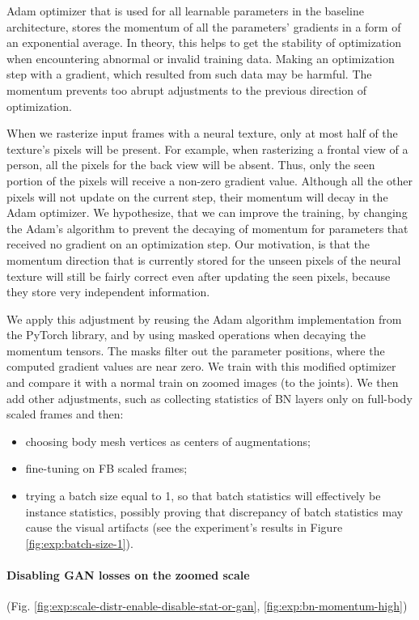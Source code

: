 Adam \cite{dnn:adam14} optimizer that is used for all learnable parameters in the baseline architecture, stores the momentum of all the parameters' gradients in a form of an exponential average. In theory, this helps to get the stability of optimization when encountering abnormal or invalid training data. Making an optimization step with a gradient, which resulted from such data may be harmful. The momentum prevents too abrupt adjustments to the previous direction of optimization. 

When we rasterize input frames with a neural texture, only at most half of the texture's pixels will be present. For example, when rasterizing a frontal view of a person, all the pixels for the back view will be absent. Thus, only the seen portion of the pixels will receive a non-zero gradient value. Although all the other pixels will not update on the current step, their momentum will decay in the Adam optimizer. We hypothesize, that we can improve the training, by changing the Adam's algorithm to prevent the decaying of momentum for parameters that received no gradient on an optimization step. Our motivation, is that the momentum direction that is currently stored for the unseen pixels of the neural texture will still be fairly correct even after updating the seen pixels, because they store very independent information.

We apply this adjustment by reusing the Adam algorithm implementation from the PyTorch library, and by using masked operations when decaying the momentum tensors. The masks filter out the parameter positions, where the computed gradient values are near zero. We train with this modified optimizer and compare it with a normal train on zoomed images (to the joints). We then add other adjustments, such as collecting statistics of BN layers only on full-body scaled frames and then:
\begin{itemize}
	\item choosing body mesh vertices as centers of augmentations;
	\item fine-tuning on FB scaled frames;
	\item trying a batch size equal to 1, so that batch statistics will effectively be instance statistics, possibly proving that discrepancy of batch statistics may cause the visual artifacts (see the experiment's results in Figure \ref{fig:exp:batch-size-1}).
\end{itemize}

\vspace{-15pt}\paragraph{Disabling GAN losses on the zoomed scale}(Fig. \ref{fig:exp:scale-distr-enable-disable-stat-or-gan}, \ref{fig:exp:bn-momentum-high})\mbox{}\nopagebreak

